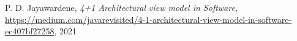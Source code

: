 \begin{thebibliography}{99999}


\singlespace\normalsize

 P. D. Jayawardene, \textit{4+1 Architectural view model in Software}, \url{https://medium.com/javarevisited/4-1-architectural-view-model-in-software-ec407bf27258}, 2021



\end{thebibliography}
